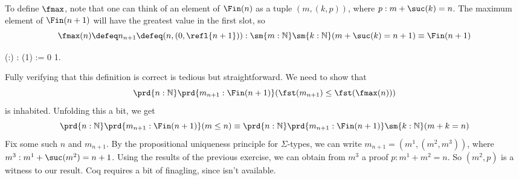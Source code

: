 To define $\fmax$, note that one can think of an element of $\Fin(n)$ as a
tuple $(m, (k, p))$, where $p : m + \suc(k) = n$.  The maximum element of
$\Fin(n+1)$ will have the greatest value in the first slot, so
\[
  \fmax(n) \defeq n_{n+1} \defeq (n, (0, \refl{n+1}))
  : \sm{m:\mathbb{N}}\sm{k:\mathbb{N}} (m+\suc(k) = n+1)
  \equiv \Fin(n+1)
\] \begin{coqdoccode}
\coqdocemptyline
\coqdocnoindent
{}  (:) : (1) := \coqdocnotation{(}\coqdocnotation{;} \coqdocnotation{(}0\coqdocnotation{;} 1\coqdocnotation{))}.\coqdoceol
\coqdocemptyline
\end{coqdoccode}
\noindent
Fully verifying that this definition is correct is tedious but straightforward.  We
need to show that
\[
  \prd{n:\mathbb{N}}\prd{m_{n+1}:\Fin(n+1)} (\fst(m_{n+1}) \leq \fst(\fmax(n)))
\]
is inhabited.  Unfolding this a bit, we get
\[
  \prd{n:\mathbb{N}}\prd{m_{n+1}:\Fin(n+1)} (m \leq n)
  \equiv
  \prd{n:\mathbb{N}}\prd{m_{n+1}:\Fin(n+1)}\sm{k:\mathbb{N}} (m + k = n)
\]
Fix some such $n$ and $m_{n+1}$.  By the propositional uniqueness principle for
$\Sigma$-types, we can write $m_{n+1} = (m^{1}, (m^{2}, m^{3}))$, where $m^{3}
: m^{1} + \suc(m^{2}) = n + 1$.  Using the results of the previous exercise, we
can obtain from $m^{3}$ a proof $p : m^{1} + m^{2} = n$.  So $(m^{2}, p)$ is a
witness to our result. 
Coq requires a bit of finagling, since  isn't available.
